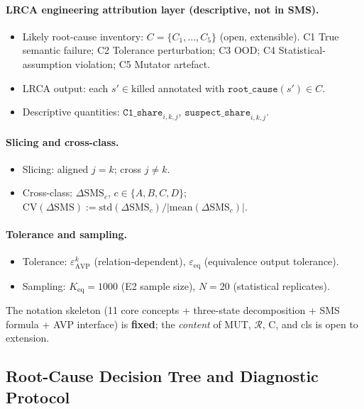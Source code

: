 \documentclass[manuscript,screen,review]{acmart}
\begin{document}
\paragraph{LRCA engineering attribution layer (descriptive, not in SMS).}
\begin{itemize}
\item Likely root-cause inventory: $C = \{C_1, \ldots, C_5\}$ (open, extensible). C1 True semantic failure; C2 Tolerance perturbation; C3 OOD; C4 Statistical-assumption violation; C5 Mutator artefact.
\item LRCA output: each $s' \in \mathrm{killed}$ annotated with $\texttt{root\_cause}(s') \in C$.
\item Descriptive quantities: $\texttt{C1\_share}_{i,k,j}$, $\texttt{suspect\_share}_{i,k,j}$.
\end{itemize}

\paragraph{Slicing and cross-class.}
\begin{itemize}
\item Slicing: aligned $j = k$; cross $j \neq k$.
\item Cross-class: $\Delta\mathrm{SMS}_c$, $c \in \{A, B, C, D\}$; $\mathrm{CV}(\Delta\mathrm{SMS}) := \mathrm{std}(\Delta\mathrm{SMS}_c) / |\mathrm{mean}(\Delta\mathrm{SMS}_c)|$.
\end{itemize}

\paragraph{Tolerance and sampling.}
\begin{itemize}
\item Tolerance: $\varepsilon_{\mathrm{AVP}}^k$ (relation-dependent), $\varepsilon_{\mathrm{eq}}$ (equivalence output tolerance).
\item Sampling: $K_{\mathrm{eq}} = 1000$ (E2 sample size), $N = 20$ (statistical replicates).
\end{itemize}

The notation skeleton (11 core concepts + three-state decomposition +
SMS formula + AVP interface) is \textbf{fixed}; the \emph{content} of
MUT, $\mathcal{R}$, C, and cls is open to extension.

\subsection{Root-Cause Decision Tree and Diagnostic Protocol}\label{a.2-lrca-decision-tree-and-three-layer-diagnostic-protocol}
\end{document}

